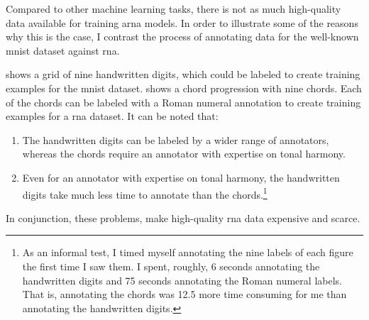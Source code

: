

Compared to other machine learning tasks, there is not as
much high-quality data available for training \gls{arna}
models. In order to illustrate some of the reasons why this
is the case, I contrast the process of annotating data for
the well-known \gls{mnist} dataset
\parencite{lecun1989handwritten} against \gls{rna}.


 shows a grid of nine handwritten digits,
which could be labeled to create training examples for the
\gls{mnist} dataset.  shows a chord
progression with nine chords. Each of the chords can be
labeled with a Roman numeral annotation to create training
examples for a \gls{rna} dataset. It can be noted that:

\begin{enumerate}
    \item The handwritten digits can be labeled by a wider
    range of annotators, whereas the chords require an
    annotator with expertise on tonal harmony.
    \item Even for an annotator with expertise on tonal
    harmony, the handwritten digits take much less time to
    annotate than the chords.\footnote{As an informal test, I
    timed myself annotating the nine labels of each figure
    the first time I saw them. I spent, roughly, 6 seconds
    annotating the handwritten digits and 75 seconds
    annotating the Roman numeral labels. That is, annotating
    the chords was 12.5 more time consuming for me than
    annotating the handwritten digits.}
\end{enumerate}

In conjunction, these problems, make high-quality \gls{rna}
data expensive and scarce.



